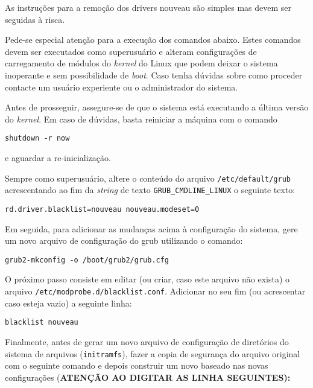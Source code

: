 \documentclass[twoside,a4paper,12pt,english]{inac17}
\begin{document}
As instruções para a remoção dos drivers nouveau são simples mas devem ser seguidas 
à risca.

\begin{shadedbox}
Pede-se especial atenção para a execução dos comandos abaixo. Estes comandos devem 
ser executados como superusuário e alteram configurações de carregamento de módulos 
do \textit{kernel} do Linux que podem deixar o sistema inoperante e sem possibilidade 
de \textit{boot}. Caso tenha dúvidas sobre como proceder contacte um usuário 
experiente ou o administrador do sistema.
\end{shadedbox}

Antes de prosseguir, assegure-se de que o sistema está executando a última versão 
do \textit{kernel}. Em caso de dúvidas, basta reiniciar a máquina com o comando 

\texttt{shutdown -r now}

e aguardar a re-inicialização.

Sempre como superusuário, altere o conteúdo do arquivo \texttt{/etc/default/grub} 
acrescentando ao fim da \textit{string} de texto \texttt{GRUB\_CMDLINE\_LINUX} 
o seguinte texto:

\texttt{rd.driver.blacklist=nouveau nouveau.modeset=0}


Em seguida, para adicionar as mudanças acima à configuração do sistema, gere um novo arquivo de configuração do grub utilizando o comando:

 \texttt{grub2-mkconfig -o /boot/grub2/grub.cfg}

O próximo passo consiste em editar (ou criar, caso este arquivo não exista) 
o arquivo \texttt{/etc/modprobe.d/blacklist.conf}. Adicionar no seu fim (ou 
acrescentar caso esteja vazio) a seguinte linha:

\texttt{blacklist nouveau}

Finalmente, antes de gerar um novo arquivo de configuração de diretórios 
do sistema de arquivos (\texttt{initramfs}), fazer a copia de segurança 
do arquivo original com o seguinte comando e depois construir um novo baseado nas novas configurações (\textbf{ATENÇÃO AO DIGITAR AS LINHA SEGUINTES):}
\end{document}
